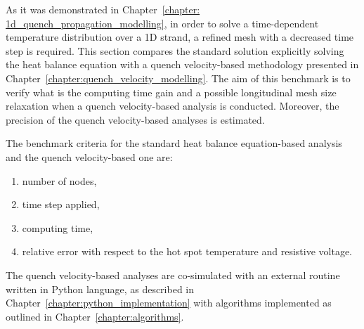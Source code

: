 
As it was demonstrated in Chapter~\ref{chapter: 1d_quench_propagation_modelling}, in order to solve a time-dependent temperature distribution over a 1D strand, a refined mesh with a decreased time step is required. This section compares the standard solution explicitly solving the heat balance equation with a quench velocity-based methodology presented in Chapter~\ref{chapter:quench_velocity_modelling}. The aim of this benchmark is to verify what is the computing time gain and a possible longitudinal mesh size relaxation when a quench velocity-based analysis is conducted. Moreover, the precision of the quench velocity-based analyses is estimated. 

The benchmark criteria for the standard heat balance equation-based analysis and the quench velocity-based one are: 
\begin{enumerate}
    \item number of nodes,
    \item time step applied,
    \item computing time,
    \item relative error with respect to the hot spot temperature and resistive voltage.
\end{enumerate}

The quench velocity-based analyses are co-simulated with an external routine written in Python language, as described in Chapter~\ref{chapter:python_implementation} with algorithms implemented as outlined in Chapter~\ref{chapter:algorithms}.

